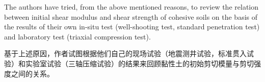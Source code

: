 \begin{paracol}{2}
    \switchcolumn*
    
    The authors have tried, from the above mentioned reasons, to review the relation between initial shear modulus and shear strength of cohesive soils on the basis of the results of their own in-situ test (well-shooting test, standard penetration test) and laboratory test (triaxial compression test).

    \switchcolumn

    基于上述原因，作者试图根据他们自己的现场试验（地震测井试验，标准贯入试验）和实验室试验（三轴压缩试验）的结果来回顾黏性土的初始剪切模量与剪切强度之间的关系。


\end{paracol}